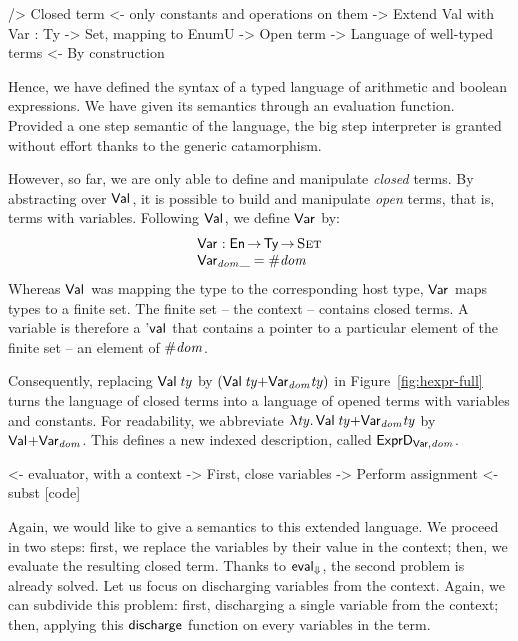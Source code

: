 \begin{wstructure}
    /> Closed term
        <- only constants and operations on them
        -> Extend Val with Var : Ty -> Set, mapping to EnumU
            -> Open term
            -> Language of well-typed terms
                <- By construction
\end{wstructure}

Hence, we have defined the syntax of a typed language of arithmetic
and boolean expressions. We have given its semantics through an
evaluation function. Provided a one step semantic of the language, the
big step interpreter is granted without effort thanks to the generic
catamorphism.

However, so far, we are only able to define and manipulate
\emph{closed} terms. By abstracting over $\Val{\!}$, it is possible to
build and manipulate \emph{open} terms, that is, terms with
variables. Following $\Val{\!}$, we define $\Var{}{}$ by:
%
\[\stk{
\Var{}{} : \EnumU \To \Ty \To \Set \\
\Var{\V{dom}}{\_} = \EnumT{\V{dom}}
}\]
%
Whereas $\Val{\!}$ was mapping the type to the corresponding host type,
$\Var{}{}$ maps types to a finite set. The finite set -- the context
-- contains closed terms. A variable is therefore a $\Eval{\!}$ that
contains a pointer to a particular element of the finite set -- an
element of $\EnumT{\V{dom}}$. 

Consequently, replacing $\Val{\V{ty}}$ by
$(\SUM{\Val{\V{ty}}}{\Var{\V{dom}}{\V{ty}}})$ in
Figure~\ref{fig:hexpr-full} turns the language of closed terms into a
language of opened terms with variables and constants. For
readability, we abbreviate $\LAM{\V{ty}}
\SUM{\Val{\V{ty}}}{\Var{\V{dom}}{\V{ty}}}$ by
$\SUM{\Val{\!}}{\Var{\V{dom}}{}}$.  This defines a new indexed description,
called $\HExprVarD{\V{dom}}$.

\begin{wstructure}
        <- evaluator, with a context
            -> First, close variables
                -> Perform assignment
                <- subst [code]
\end{wstructure}

\newcommand{\discharge}{\F{discharge}}

Again, we would like to give a semantics to this extended language. We
proceed in two steps: first, we replace the variables by their value
in the context; then, we evaluate the resulting closed term. Thanks to
$\evalH$, the second problem is already solved. Let us focus on
discharging variables from the context. Again, we can subdivide this
problem: first, discharging a single variable from the context; then,
applying this $\discharge$ function on every variables in the term.


